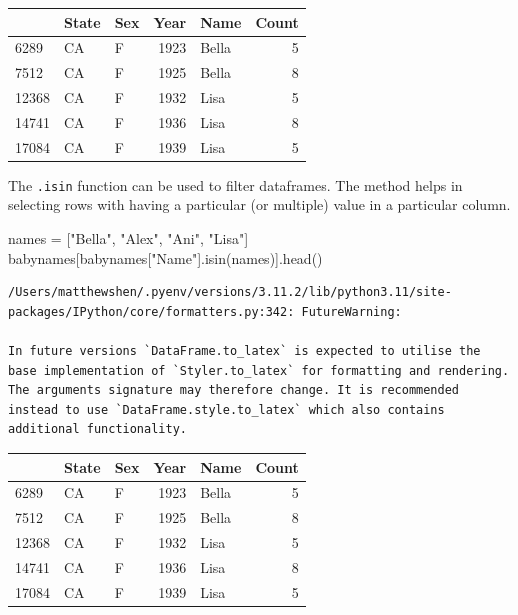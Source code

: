\documentclass[
  letterpaper,
  DIV=11,
  numbers=noendperiod]{scrreprt}
\newenvironment{Shaded}{\begin{snugshade}}{\end{snugshade}}
\newcommand{\NormalTok}[1]{\textcolor[rgb]{0.00,0.23,0.31}{#1}}
\newcommand{\OperatorTok}[1]{\textcolor[rgb]{0.37,0.37,0.37}{#1}}
\newcommand{\StringTok}[1]{\textcolor[rgb]{0.13,0.47,0.30}{#1}}
\begin{document}
\begin{tabular}{lllrlr}
\toprule
{} & State & Sex &  Year &   Name &  Count \\
\midrule
6289  &    CA &   F &  1923 &  Bella &      5 \\
7512  &    CA &   F &  1925 &  Bella &      8 \\
12368 &    CA &   F &  1932 &   Lisa &      5 \\
14741 &    CA &   F &  1936 &   Lisa &      8 \\
17084 &    CA &   F &  1939 &   Lisa &      5 \\
\bottomrule
\end{tabular}

The \texttt{.isin} function can be used to filter dataframes. The method
helps in selecting rows with having a particular (or multiple) value in
a particular column.

\begin{Shaded}
\begin{Highlighting}[]
\NormalTok{names }\OperatorTok{=}\NormalTok{ [}\StringTok{"Bella"}\NormalTok{, }\StringTok{"Alex"}\NormalTok{, }\StringTok{"Ani"}\NormalTok{, }\StringTok{"Lisa"}\NormalTok{]}
\NormalTok{babynames[babynames[}\StringTok{"Name"}\NormalTok{].isin(names)].head()}
\end{Highlighting}
\end{Shaded}

\begin{verbatim}
/Users/matthewshen/.pyenv/versions/3.11.2/lib/python3.11/site-packages/IPython/core/formatters.py:342: FutureWarning:

In future versions `DataFrame.to_latex` is expected to utilise the base implementation of `Styler.to_latex` for formatting and rendering. The arguments signature may therefore change. It is recommended instead to use `DataFrame.style.to_latex` which also contains additional functionality.
\end{verbatim}

\begin{tabular}{lllrlr}
\toprule
{} & State & Sex &  Year &   Name &  Count \\
\midrule
6289  &    CA &   F &  1923 &  Bella &      5 \\
7512  &    CA &   F &  1925 &  Bella &      8 \\
12368 &    CA &   F &  1932 &   Lisa &      5 \\
14741 &    CA &   F &  1936 &   Lisa &      8 \\
17084 &    CA &   F &  1939 &   Lisa &      5 \\
\bottomrule
\end{tabular}
\end{document}
